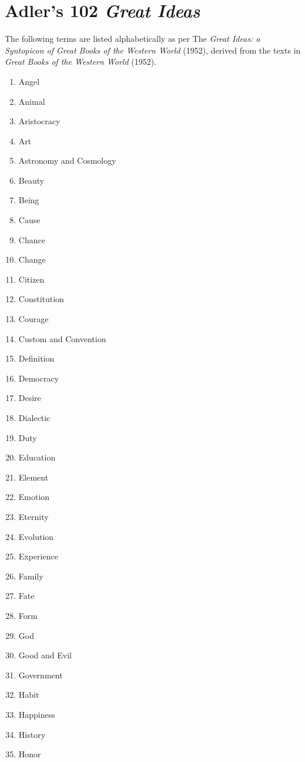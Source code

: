 \section{Adler’s 102 \textit{Great Ideas}}
The following terms are listed alphabetically as per The \textit{Great Ideas: a Syntopicon of Great Books of the Western World} (1952), derived from the texts in \textit{Great Books of the Western World} (1952).
\begin{multicols}{4} %
\begin{enumerate}[label=\arabic*.]
    \item Angel
    \item Animal
    \item Aristocracy
    \item Art
    \item Astronomy and Cosmology
    \item Beauty
    \item Being
    \item Cause
    \item Chance
    \item Change
    \item Citizen
    \item Constitution
    \item Courage
    \item Custom and Convention
    \item Definition
    \item Democracy
    \item Desire
    \item Dialectic
    \item Duty
    \item Education
    \item Element
    \item Emotion
    \item Eternity
    \item Evolution
    \item Experience
    \item Family
    \item Fate
    \item Form
    \item God
    \item Good and Evil
    \item Government
    \item Habit
    \item Happiness
    \item History
    \item Honor

\end{enumerate}
\end{multicols}
